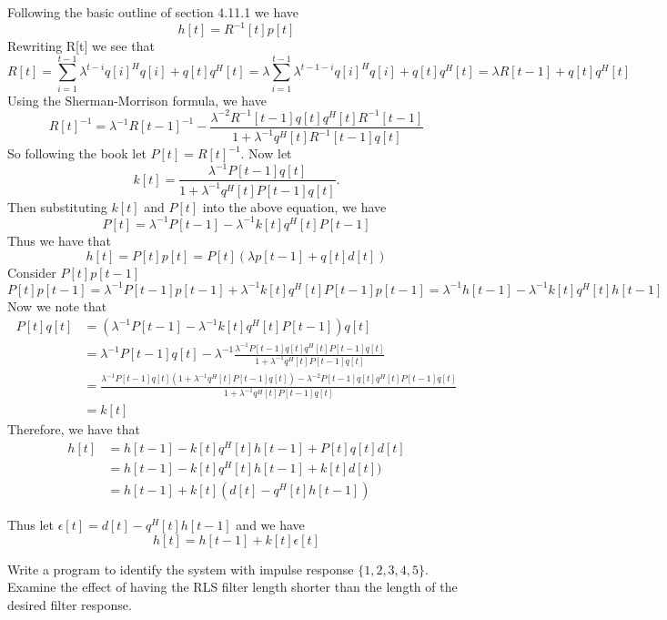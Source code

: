 \documentclass{homework}
\begin{document}
\begin{solution}
  Following the basic outline of section 4.11.1 we have
  \[ h[t] = R^{-1}[t]p[t] \]
  Rewriting R[t] we see that
  \[ R[t] = \sum^{t-1}_{i=1} \lambda^{t-i}q[i]^Hq[i] + q[t]q^H[t] = \lambda\sum^{t-1}_{i=1} \lambda^{t - 1 - i}q[i]^Hq[i] + q[t]q^H[t] = \lambda R[t-1] + q[t]q^H[t]\]
  Using the Sherman-Morrison formula, we have
  \[ 
    R[t]^{-1} = \lambda^{-1}R[t-1]^{-1} - \frac{\lambda^{-2}R^{-1}[t-1]q[t]q^H[t]R^{-1}[t-1]}{1 + \lambda^{-1}q^{H}[t]R^{-1}[t-1]q[t]} 
  \]
  So following the book let $P[t] = R[t]^{-1}$. Now let
  \[
    k[t] = \frac{\lambda^{-1}P[t-1]q[t]}{1 + \lambda^{-1}q^{H}[t]P[t-1]q[t]}.
  \]
  Then substituting $k[t]$ and $P[t]$ into the above equation, we have
  \[
    P[t] = \lambda^{-1}P[t-1] - \lambda^{-1}k[t]q^{H}[t]P[t-1]
  \]
  Thus we have that
  \[ 
    h[t] = P[t]p[t] = P[t](\lambda p[t-1] + q[t]d[t])
  \]
  Consider $P[t]p[t-1]$
  \[ P[t]p[t-1] = \lambda^{-1}P[t-1]p[t-1] + \lambda^{-1}k[t]q^H[t]P[t-1]p[t-1] = \lambda^{-1}h[t-1] - \lambda^{-1}k[t]q^H[t]h[t-1]\]
  Now we note that 
  \[ 
    \begin{aligned}
      P[t]q[t] &= (\lambda^{-1}P[t-1] - \lambda^{-1}k[t]q^{H}[t]P[t-1])q[t] \\
               &= \lambda^{-1}P[t-1]q[t] - \lambda^{-1}\frac{\lambda^{-1}P[t-1]q[t]q^H[t]P[t-1]q[t]}{1 + \lambda^{-1}q^{H}[t]P[t-1]q[t]}\\
               &= \frac{\lambda^{-1}P[t-1]q[t](1 + \lambda^{-1}q^H[t]P[t-1]q[t]) -\lambda^{-2}P[t-1]q[t]q^H[t]P[t-1]q[t]}{1 + \lambda^{-1}q^H[t]P[t-1]q[t]} \\
               &= k[t]
    \end{aligned} \]
  Therefore, we have that
  \[ 
    \begin{aligned}
      h[t] &= h[t-1] - k[t]q^H[t]h[t-1] + P[t]q[t]d[t] \\
           &= h[t-1] - k[t]q^H[t]h[t-1] + k[t]d[t]) \\
           &= h[t-1] + k[t](d[t] - q^H[t]h[t-1])
    \end{aligned}
  \]

  Thus let $\epsilon[t] = d[t] - q^H[t]h[t-1]$ and we have
  \[ h[t] = h[t-1] + k[t]\epsilon[t] \]
\end{solution}

\begin{problem}[4-55]
  Write a program to identify the system with impulse response $\{1,2,3,4,5\}$. Examine the effect of having the RLS filter length shorter than the length of the desired filter response.
\end{problem}
\end{document}
